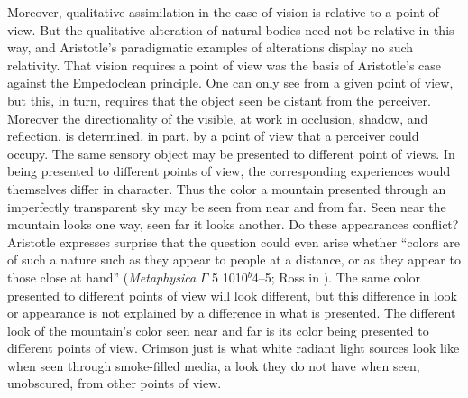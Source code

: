 Moreover, qualitative assimilation in the case of vision is relative to a point of view. But the qualitative alteration of natural bodies need not be relative in this way, and Aristotle's paradigmatic examples of alterations display no such relativity. That vision requires a point of view was the basis of Aristotle's case against the Empedoclean principle. One can only see from a given point of view, but this, in turn, requires that the object seen be distant from the perceiver. Moreover the directionality of the visible, at work in occlusion, shadow, and reflection, is determined, in part, by a point of view that a perceiver could occupy. The same sensory object may be presented to different point of views. In being presented to different points of view, the corresponding experiences would themselves differ in character. Thus the color a mountain presented through an imperfectly transparent sky may be seen from near and from far. Seen near the mountain looks one way, seen far it looks another. Do these appearances conflict? Aristotle expresses surprise that the question could even arise whether ``colors are of such a nature such as they appear to people at a distance, or as they appear to those close at hand'' (\emph{Metaphysica} \( \Gamma \) 5 1010\( ^{b} \)4--5; Ross in \citealt[55]{Barnes:1984kx}). The same color presented to different points of view will look different, but this difference in look or appearance is not explained by a difference in what is presented. The different look of the mountain's color seen near and far is its color being presented to different points of view. Crimson just is what white radiant light sources look like when seen through smoke-filled media, a look they do not have when seen, unobscured, from other points of view.

